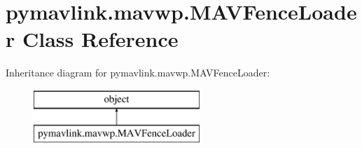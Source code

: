 \hypertarget{classpymavlink_1_1mavwp_1_1MAVFenceLoader}{}\section{pymavlink.\+mavwp.\+M\+A\+V\+Fence\+Loader Class Reference}
\label{classpymavlink_1_1mavwp_1_1MAVFenceLoader}
Inheritance diagram for pymavlink.\+mavwp.\+M\+A\+V\+Fence\+Loader\+:\begin{figure}[H]
\begin{center}
\leavevmode
\includegraphics[height=2.000000cm]{classpymavlink_1_1mavwp_1_1MAVFenceLoader}
\end{center}
\end{figure}
